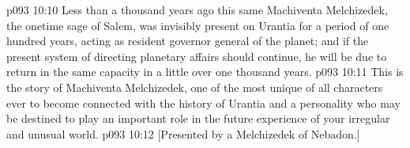 \vs p093 10:10 Less than a thousand years ago this same Machiventa Melchizedek, the onetime sage of Salem, was invisibly present on Urantia for a period of one hundred years, acting as resident governor general of the planet; and if the present system of directing planetary affairs should continue, he will be due to return in the same capacity in a little over one thousand years.
\vs p093 10:11 \pc This is the story of Machiventa Melchizedek, one of the most unique of all characters ever to become connected with the history of Urantia and a personality who may be destined to play an important role in the future experience of your irregular and unusual world.
\vsetoff
\vs p093 10:12 [Presented by a Melchizedek of Nebadon.]
